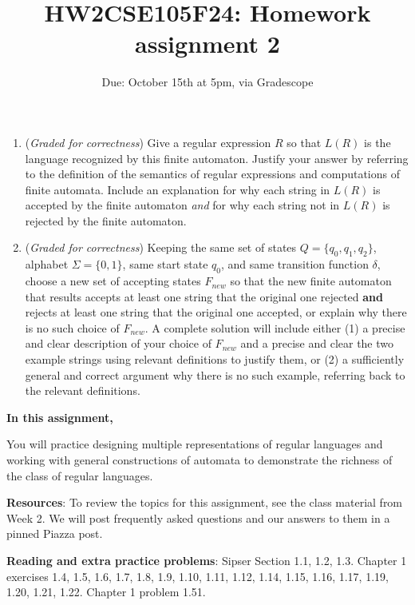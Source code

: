 \documentclass[12pt, oneside]{article}
\newcommand{\gradeCorrect}{({\it Graded for correctness}) }
\begin{document}
\begin{enumerate}[wide, labelwidth=!, labelindent=0pt]
\begin{enumerate}
    \item\gradeCorrect Give a regular expression $R$ so that $L(R)$ is the language 
    recognized by this finite automaton. Justify your answer by referring to the 
    definition of the semantics of regular expressions and computations of finite automata. 
    Include an explanation for why each string in $L(R)$ is accepted by the finite automaton {\it and}
    for why each string not in $L(R)$ is rejected by the finite automaton.

    \item\gradeCorrect Keeping the same set of states $Q = \{q_0, q_1, q_2\}$, alphabet $\Sigma = \{0,1\}$, 
    same start state $q_0$, and same transition 
    function $\delta$, choose a new set of accepting states $F_{new}$ so that the new 
    finite automaton that results accepts at least one string that the original one rejected {\bf and} rejects
    at least one string that the original one accepted, or explain why there is no such choice of $F_{new}$.
    A complete solution will include either (1) a precise and
    clear description of your choice of $F_{new}$
    and a precise and clear the two example strings using relevant definitions 
    to justify them, or (2) a sufficiently general and correct argument
    why there is no such example, referring back to the relevant definitions.

    \end{enumerate}
    
    \end{enumerate}
\newpage

\title{HW2CSE105F24: Homework assignment 2}
\date{Due: October 15th at 5pm, via Gradescope}



\maketitle
\thispagestyle{fancy}

{\bf In this assignment,}

You will practice designing multiple representations of regular languages and working with 
general constructions of automata to demonstrate the richness of the class of regular languages.


{\bf Resources}: To review the topics 
for this assignment, see the class material from Week 2.
We will post frequently asked questions and our answers to them in a 
pinned Piazza post. 

{\bf Reading and extra practice problems}:  
Sipser Section 1.1, 1.2, 1.3. 
Chapter 1 exercises 1.4, 1.5, 1.6, 1.7, 1.8, 1.9, 1.10, 1.11, 1.12, 1.14, 1.15, 
1.16, 1.17, 1.19, 1.20, 1.21, 1.22. Chapter 1 problem 1.51.
\end{document}

